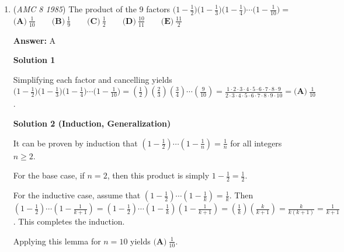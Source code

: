\begin{enumerate}
 The largest element of this set is therefore $6$, that is, $\boxed{\textbf{(A)} -3a}$.

 



\textbf{Solution 2}

Since $a$ is negative, $-3a$, $a^2$, and $1$ must be positive while $4a$ and $\frac{24}{a}$ are negative.  Evaluating the positive expressions shows that $\boxed{\textbf{(A)} -3a} = 6$ is the largest.

 


	\item (\textit{AMC 8 1985}) The product of the 9 factors $\Big(1 - \frac12\Big)\Big(1 - \frac13\Big)\Big(1 - \frac14\Big)\cdots\Big(1 - \frac {1}{10}\Big) =$
$\textbf{(A)}\ \frac {1}{10} \qquad \textbf{(B)}\ \frac {1}{9} \qquad \textbf{(C)}\ \frac {1}{2} \qquad \textbf{(D)}\ \frac {10}{11} \qquad \textbf{(E)}\ \frac {11}{2}$

 \textbf{Answer: }A



\textbf{Solution 1}

Simplifying each factor and cancelling yields $\Big(1 - \frac12\Big)\Big(1 - \frac13\Big)\Big(1 - \frac14\Big)\cdots\Big(1 - \frac {1}{10}\Big) =\left(\frac{1}{2}\right)\left(\frac{2}{3}\right)\left(\frac{3}{4}\right)\cdots\left(\frac{9}{10}\right) = \frac{1\cdot2\cdot3\cdot4\cdot5\cdot6\cdot7\cdot8\cdot9}{2\cdot3\cdot4\cdot5\cdot6\cdot7\cdot8\cdot9\cdot10} = \boxed{\textbf{(A)}\ \frac{1}{10}}$.

 



\textbf{Solution 2 (Induction, Generalization)}

It can be proven by induction that $\left(1 - \frac{1}{2}\right)\cdots\left(1 - \frac{1}{n}\right) = \frac{1}{n}$ for all integers $n \geq 2$.

 For the base case, if $n = 2$, then this product is simply $1 - \frac{1}{2} = \frac{1}{2}$.

 For the inductive case, assume that $\left(1 - \frac{1}{2}\right)\cdots\left(1-\frac{1}{k}\right) = \frac{1}{k}$.  Then $\left(1 - \frac{1}{2}\right)\cdots\left(1-\frac{1}{k+1}\right) = \left(1 - \frac{1}{2}\right)\cdots\left(1-\frac{1}{k}\right)\left(1-\frac{1}{k+1}\right) = \left(\frac{1}{k}\right)\left(\frac{k}{k+1}\right) = \frac{k}{k(k+1)} = \frac{1}{k+1}$.  This completes the induction.

 Applying this lemma for $n = 10$ yields $\boxed{\textbf{(A)}\ \frac{1}{10}}$.


\end{enumerate}
